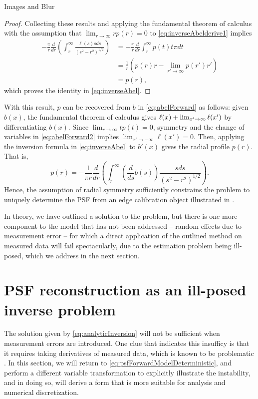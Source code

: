 \begin{chapter}{Images and Blur}
\begin{proof}
  Collecting these results and applying the fundamental theorem of calculus with the assumption that $\lim_{r\to\infty}rp(r) = 0$ to \eqref{eq:inverseAbelderive1} implies
  \begin{align}
    -\frac{\pi}{r} \frac{d}{dr} \left(\int_r^\infty \frac{\ell(s) s ds}{ (s^2 - r^2)^{1/2} } \right) 
      &= -\frac{\pi}{r} \frac{d}{dr} \int_r^\infty p(t) t \pi dt \nonumber\\
      &= \frac{1}{r} \left(p(r)r - \lim_{r'\to\infty}p(r')r'\right) \nonumber\\
      &= p(r),
  \end{align}
  which proves the identity in \eqref{eq:inverseAbel}.
\end{proof}
  
  With this result, $p$ can be recovered from $b$ in \eqref{eq:abelForward} as follows: given $b(x)$, the fundamental theorem of calculus gives $\ell(x) + \lim_{x'\to\-\infty}\ell(x')$ by differentiating $b(x)$.
  Since $\lim_{r\to\infty}tp(t) = 0$, symmetry and the change of variables in \eqref{eq:abelForward2} implies $\lim_{x'\to-\infty}\ell(x') = 0$. 
  Then, applying the inversion formula in \eqref{eq:inverseAbel} to $b'(x)$ gives the radial profile $p(r)$.
  That is,
  \begin{equation} \label{eq:analyticInversion}
    p(r) = -\frac{1}{\pi r} \frac{d}{dr}\left(\int_r^\infty \left(\frac{d}{ds} b(s)\right) \frac{ s ds}{ (s^2 - r^2)^{1/2} } \right).  
  \end{equation}
  Hence, the assumption of radial symmetry sufficiently constrains the problem to uniquely determine the PSF from an edge calibration object illustrated in .

  In theory, we have outlined a solution to the problem, but there is one more component to the model that has not been addressed -- random effects due to measurement error -- for which a direct application of the outlined method on measured data will fail spectacularly, due to the estimation problem being ill-posed, which we address in the next section.

\section{PSF reconstruction as an ill-posed inverse problem}
  
  The solution given by \eqref{eq:analyticInversion} will not be sufficient when measurement errors are introduced. 
  One clue that indicates this insufficy is that it requires taking derivatives of measured data, which is known to be problematic \citep{hanke2001}.
  In this section, we will return to \eqref{eq:psfForwardModelDeterministic}, and perform a different variable transformation to explicitly illustrate the instability, and in doing so, will derive a form that is more suitable for analysis and numerical discretization.


\end{chapter}
